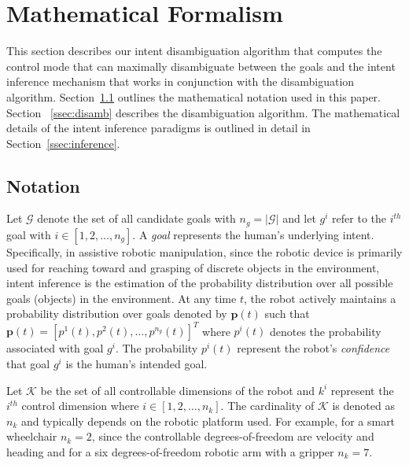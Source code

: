 \documentclass[natbib, twocolumn]{svjour3}          %
\begin{document}
\section{Mathematical Formalism}\label{sec:ma}
This section describes our intent disambiguation algorithm that computes the control mode that can maximally disambiguate between the goals and the intent inference mechanism that works in conjunction with the disambiguation algorithm. Section~\ref{ssec:notation} outlines the mathematical notation used in this paper. Section ~\ref{ssec:disamb} describes the disambiguation algorithm. The mathematical details of the intent inference paradigms is outlined in detail in Section~\ref{ssec:inference}.
\subsection{Notation}\label{ssec:notation}
Let $\mathcal{G}$ denote the set of all candidate goals with $n_g = \vert\mathcal{G}\vert$ and let $g^i$ refer to the $i^{th}$ goal with $i \in [1,2,\dots, n_g]$. A \textit{goal} represents the human's underlying intent. Specifically, in assistive robotic manipulation, since the robotic device is primarily used for reaching toward and grasping of discrete objects in the environment, intent inference is the estimation of the probability distribution over all possible goals (objects) in the environment. At any time $t$, the robot actively maintains a probability distribution over goals denoted by $\boldsymbol{p}(t)$ such that $\boldsymbol{p}(t) = [p^1(t), p^2(t),\dots, p^{n_g}(t)]^{T}$ where $p^i(t)$ denotes the probability associated with goal $g^i$.  The probability $p^i(t)$ represent the robot's \textit{confidence} that goal $g^i$ is the human's intended goal. 

Let $\mathcal{K}$ be the set of all controllable dimensions of the robot and $k^i$ represent the $i^{th}$ control dimension where $i \in [1,2,\dots,n_k]$. The cardinality of $\mathcal{K}$ is denoted as $n_k$ and typically depends on the robotic platform used. For example, for a smart wheelchair $n_k = 2$, since the controllable degrees-of-freedom are velocity and heading and for a six degrees-of-freedom robotic arm with a gripper $n_k = 7$. 
\end{document}
